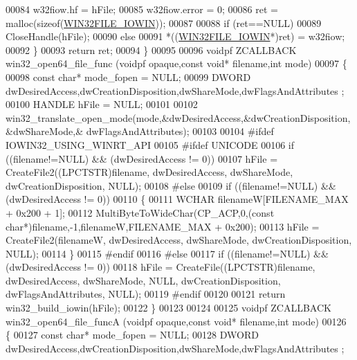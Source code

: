 \begin{DoxyCode}
00084         w32fiow.hf = hFile;
00085         w32fiow.error = 0;
00086         ret = malloc(\textcolor{keyword}{sizeof}(\hyperlink{struct_w_i_n32_f_i_l_e___i_o_w_i_n}{WIN32FILE\_IOWIN}));
00087 
00088         \textcolor{keywordflow}{if} (ret==NULL)
00089             CloseHandle(hFile);
00090         \textcolor{keywordflow}{else}
00091             *((\hyperlink{struct_w_i_n32_f_i_l_e___i_o_w_i_n}{WIN32FILE\_IOWIN}*)ret) = w32fiow;
00092     \}
00093     \textcolor{keywordflow}{return} ret;
00094 \}
00095 
00096 voidpf ZCALLBACK win32\_open64\_file\_func (voidpf opaque,\textcolor{keyword}{const} \textcolor{keywordtype}{void}* filename,\textcolor{keywordtype}{int} mode)
00097 \{
00098     \textcolor{keyword}{const} \textcolor{keywordtype}{char}* mode\_fopen = NULL;
00099     DWORD dwDesiredAccess,dwCreationDisposition,dwShareMode,dwFlagsAndAttributes ;
00100     HANDLE hFile = NULL;
00101 
00102     win32\_translate\_open\_mode(mode,&dwDesiredAccess,&dwCreationDisposition,&dwShareMode,&
      dwFlagsAndAttributes);
00103 
00104 \textcolor{preprocessor}{#ifdef IOWIN32\_USING\_WINRT\_API}
00105 \textcolor{preprocessor}{#ifdef UNICODE}
00106     \textcolor{keywordflow}{if} ((filename!=NULL) && (dwDesiredAccess != 0))
00107         hFile = CreateFile2((LPCTSTR)filename, dwDesiredAccess, dwShareMode, dwCreationDisposition, NULL);
00108 \textcolor{preprocessor}{#else}
00109     \textcolor{keywordflow}{if} ((filename!=NULL) && (dwDesiredAccess != 0))
00110     \{
00111         WCHAR filenameW[FILENAME\_MAX + 0x200 + 1];
00112         MultiByteToWideChar(CP\_ACP,0,(\textcolor{keyword}{const} \textcolor{keywordtype}{char}*)filename,-1,filenameW,FILENAME\_MAX + 0x200);
00113         hFile = CreateFile2(filenameW, dwDesiredAccess, dwShareMode, dwCreationDisposition, NULL);
00114     \}
00115 \textcolor{preprocessor}{#endif}
00116 \textcolor{preprocessor}{#else}
00117     \textcolor{keywordflow}{if} ((filename!=NULL) && (dwDesiredAccess != 0))
00118         hFile = CreateFile((LPCTSTR)filename, dwDesiredAccess, dwShareMode, NULL, dwCreationDisposition, 
      dwFlagsAndAttributes, NULL);
00119 \textcolor{preprocessor}{#endif}
00120 
00121     \textcolor{keywordflow}{return} win32\_build\_iowin(hFile);
00122 \}
00123 
00124 
00125 voidpf ZCALLBACK win32\_open64\_file\_funcA (voidpf opaque,\textcolor{keyword}{const} \textcolor{keywordtype}{void}* filename,\textcolor{keywordtype}{int} mode)
00126 \{
00127     \textcolor{keyword}{const} \textcolor{keywordtype}{char}* mode\_fopen = NULL;
00128     DWORD dwDesiredAccess,dwCreationDisposition,dwShareMode,dwFlagsAndAttributes ;

\end{DoxyCode}
